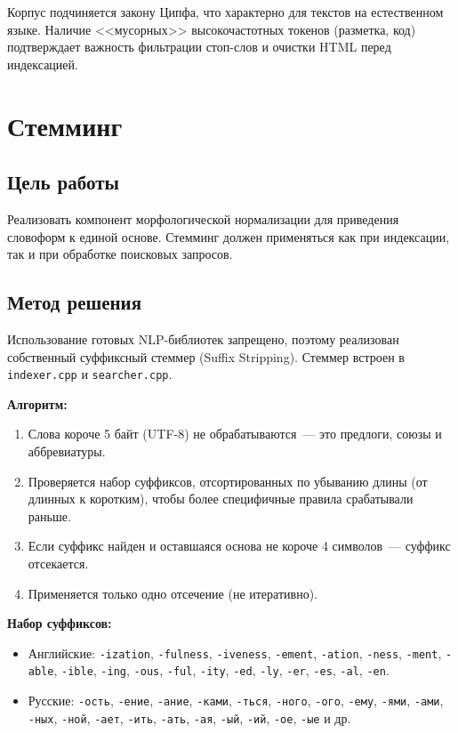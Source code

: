 \documentclass[12pt,a4paper]{article}
\begin{document}
Корпус подчиняется закону Ципфа, что характерно для текстов на естественном языке. Наличие <<мусорных>> высокочастотных токенов (разметка, код) подтверждает важность фильтрации стоп-слов и очистки HTML перед индексацией.

\newpage


\section{Стемминг}

\subsection{Цель работы}

Реализовать компонент морфологической нормализации для приведения словоформ к единой основе. Стемминг должен применяться как при индексации, так и при обработке поисковых запросов.

\subsection{Метод решения}

Использование готовых NLP-библиотек запрещено, поэтому реализован собственный суффиксный стеммер (Suffix Stripping). Стеммер встроен в \texttt{indexer.cpp} и \texttt{searcher.cpp}.

\textbf{Алгоритм:}
\begin{enumerate}
    \item Слова короче 5 байт (UTF-8) не обрабатываются~--- это предлоги, союзы и аббревиатуры.
    \item Проверяется набор суффиксов, отсортированных по убыванию длины (от длинных к коротким), чтобы более специфичные правила срабатывали раньше.
    \item Если суффикс найден и оставшаяся основа не короче 4 символов~--- суффикс отсекается.
    \item Применяется только одно отсечение (не итеративно).
\end{enumerate}

\textbf{Набор суффиксов:}
\begin{itemize}
    \item Английские: \texttt{-ization}, \texttt{-fulness}, \texttt{-iveness}, \texttt{-ement}, \texttt{-ation}, \texttt{-ness}, \texttt{-ment}, \texttt{-able}, \texttt{-ible}, \texttt{-ing}, \texttt{-ous}, \texttt{-ful}, \texttt{-ity}, \texttt{-ed}, \texttt{-ly}, \texttt{-er}, \texttt{-es}, \texttt{-al}, \texttt{-en}.
    \item Русские: \texttt{-ость}, \texttt{-ение}, \texttt{-ание}, \texttt{-ками}, \texttt{-ться}, \texttt{-ного}, \texttt{-ого}, \texttt{-ему}, \texttt{-ями}, \texttt{-ами}, \texttt{-ных}, \texttt{-ной}, \texttt{-ает}, \texttt{-ить}, \texttt{-ать}, \texttt{-ая}, \texttt{-ый}, \texttt{-ий}, \texttt{-ое}, \texttt{-ые} и др.
\end{itemize}
\end{document}
